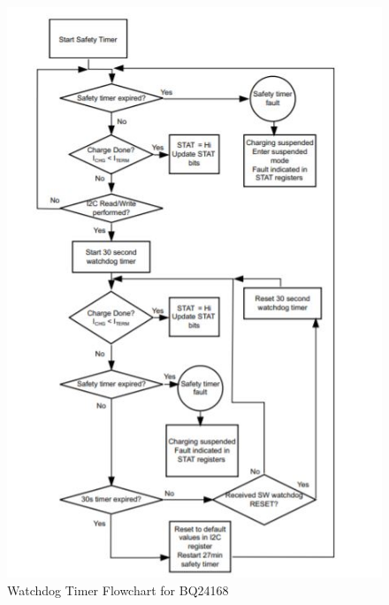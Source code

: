 \begin{figure}
    \centering
    \includegraphics[scale=.85]{figures/watchdog-flowchart.JPG}
    \caption{Watchdog Timer Flowchart for BQ24168}
    \label{fig:watchdog-flow} 
\end{figure}

